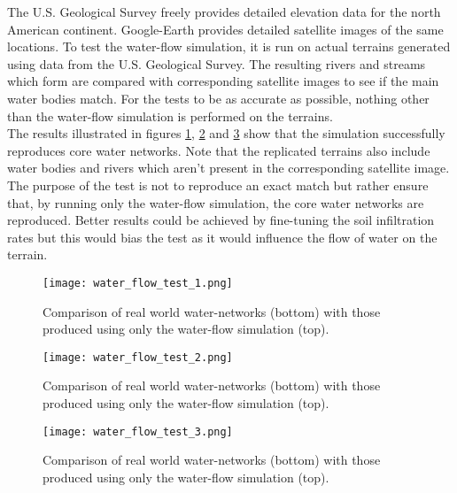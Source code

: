 The U.S. Geological Survey \protect\footnotemark {}  freely provides detailed elevation data for the north American continent. Google-Earth \protect\footnotemark {} provides detailed satellite images of the same locations. To test the water-flow simulation, it is run on actual terrains generated using data from the U.S. Geological Survey. The resulting rivers and streams which form are compared with corresponding satellite images to see if the main water bodies match. For the tests to be as accurate as possible, nothing other than the water-flow simulation is performed on the terrains. \\
The results illustrated in figures \ref{fig:water_flow_test_1}, \ref{fig:water_flow_test_2} and \ref{fig:water_flow_test_3} show that the simulation successfully reproduces core water networks. Note that the replicated terrains also include water bodies and rivers which aren't present in the corresponding satellite image. The purpose of the test is not to reproduce an exact match but rather ensure that, by running only the water-flow simulation, the core water networks are reproduced. Better results could be achieved by fine-tuning the soil infiltration rates but this would bias the test as it would influence the flow of water on the terrain.

\begin{figure}
\center
	\texttt{[image: water\_flow\_test\_1.png]}
	\caption{ Comparison of real world water-networks (bottom) with those produced using only the water-flow simulation (top).}
	\label{fig:water_flow_test_1}
\end{figure}

\begin{figure}
\center
	\texttt{[image: water\_flow\_test\_2.png]}
	\caption{ Comparison of real world water-networks (bottom) with those produced using only the water-flow simulation (top).}
	\label{fig:water_flow_test_2}
\end{figure}

\begin{figure}
\center
	\texttt{[image: water\_flow\_test\_3.png]}
	\caption{ Comparison of real world water-networks (bottom) with those produced using only the water-flow simulation (top).}
	\label{fig:water_flow_test_3}
\end{figure}
